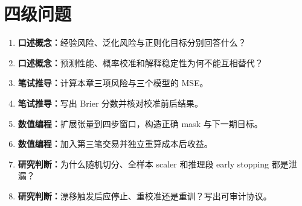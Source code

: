 \section{四级问题}
\begin{enumerate}[leftmargin=*]
  \item \textbf{口述概念：}经验风险、泛化风险与正则化目标分别回答什么？
  \item \textbf{口述概念：}预测性能、概率校准和解释稳定性为何不能互相替代？
  \item \textbf{笔试推导：}计算本章三项风险与三个模型的 MSE。
  \item \textbf{笔试推导：}写出 Brier 分数并核对校准前后结果。
  \item \textbf{数值编程：}扩展张量到四步窗口，构造正确 mask 与下一期目标。
  \item \textbf{数值编程：}加入第三笔交易并独立重算成本后收益。
  \item \textbf{研究判断：}为什么随机切分、全样本 scaler 和推理段 early stopping 都是泄漏？
  \item \textbf{研究判断：}漂移触发后应停止、重校准还是重训？写出可审计协议。
\end{enumerate}

